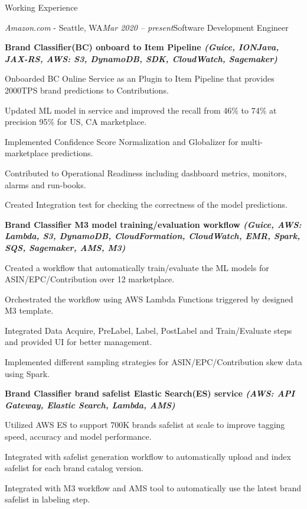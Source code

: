 \documentclass{resume} %
\begin{document}
\begin{rSection}{Working Experience}

\begin{rSubsection}{\textit{Amazon.com} - Seattle, WA}{\textit{Mar 2020 -- present}}{Software Development Engineer}

\textbf{Brand Classifier(BC) onboard to Item Pipeline \textit{(Guice, IONJava, JAX-RS, AWS: S3, DynamoDB, SDK, CloudWatch, Sagemaker)}}
\item Onboarded BC Online Service as an Plugin to Item Pipeline that provides 2000TPS brand predictions to Contributions.
\item Updated ML model in service and improved the recall from 46\% to 74\% at precision 95\% for US, CA marketplace.
\item Implemented Confidence Score Normalization and Globalizer for multi-marketplace predictions.
\item Contributed to Operational Readiness including dashboard metrics, monitors, alarms and run-books.
\item Created Integration test for checking the correctness of the model predictions.

\textbf{Brand Classifier M3 model training/evaluation workflow \textit{(Guice, AWS: Lambda, S3, DynamoDB, CloudFormation, CloudWatch, EMR, Spark, SQS, Sagemaker, AMS, M3)}}
\item Created a workflow that automatically train/evaluate the ML models for ASIN/EPC/Contribution over 12 marketplace.
\item Orchestrated the workflow using AWS Lambda Functions triggered by designed M3 template.
\item Integrated Data Acquire, PreLabel, Label, PostLabel and Train/Evaluate steps and provided UI for better management. 
\item Implemented different sampling strategies for ASIN/EPC/Contribution skew data using Spark.

\textbf{Brand Classifier brand safelist Elastic Search(ES) service \textit{(AWS: API Gateway, Elastic Search, Lambda, AMS)}}
\item Utilized AWS ES to support 700K brands safelist at scale to improve tagging speed, accuracy and model performance.
\item Integrated with safelist generation workflow to automatically upload and index safelist for each brand catalog version.
\item Integrated with M3 workflow and AMS tool to automatically use the latest brand safelist in labeling step.


\end{rSubsection}
\end{rSection}
\end{document}
